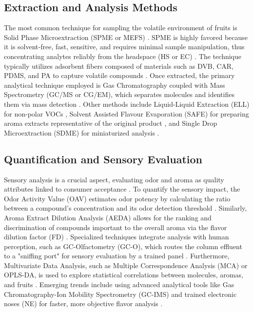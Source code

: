 \subsection{Extraction and Analysis Methods}
The most common technique for sampling the volatile environment of fruits is Solid Phase Microextraction (SPME or MEFS) \cite*{A01_Aguirre-Lopez_2023}. SPME is highly favored because it is solvent-free, fast, sensitive, and requires minimal sample manipulation, thus concentrating analytes reliably from the headspace (HS or EC) \cite*{A01_Aguirre-Lopez_2023,A03_PanoFarias2017}. The technique typically utilizes adsorbent fibers composed of materials such as DVB, CAR, PDMS, and PA to capture volatile compounds \cite*{A01_Aguirre-Lopez_2023}. Once extracted, the primary analytical technique employed is Gas Chromatography coupled with Mass Spectrometry (GC/MS or CG/EM), which separates molecules and identifies them via mass detection \cite*{A01_Aguirre-Lopez_2023}. Other methods include Liquid-Liquid Extraction (ELL) for non-polar VOCs \cite*{A01_Aguirre-Lopez_2023}, Solvent Assisted Flavour Evaporation (SAFE) for preparing aroma extracts representative of the original product \cite*{A01_Aguirre-Lopez_2023}, and Single Drop Microextraction (SDME) for miniaturized analysis \cite*{A03_PanoFarias2017}.


\subsection{Quantification and Sensory Evaluation}
Sensory analysis is a crucial aspect, evaluating odor and aroma as quality attributes linked to consumer acceptance \cite*{A01_Aguirre-Lopez_2023}. To quantify the sensory impact, the Odor Activity Value (OAV) estimates odor potency by calculating the ratio between a compound's concentration and its odor detection threshold \cite*{A01_Aguirre-Lopez_2023,A07_Bonneau2016}. Similarly, Aroma Extract Dilution Analysis (AEDA) allows for the ranking and discrimination of compounds important to the overall aroma via the flavor dilution factor (FD) \cite*{A01_Aguirre-Lopez_2023,A07_Bonneau2016}. Specialized techniques integrate analysis with human perception, such as GC-Olfactometry (GC-O), which routes the column effluent to a "sniffing port" for sensory evaluation by a trained panel \cite*{A01_Aguirre-Lopez_2023}. Furthermore, Multivariate Data Analysis, such as Multiple Correspondence Analysis (MCA) or OPLS-DA, is used to explore statistical correlations between molecules, aromas, and fruits \cite*{A01_Aguirre-Lopez_2023,A15_Xie2023}. Emerging trends include using advanced analytical tools like Gas Chromatography-Ion Mobility Spectrometry (GC-IMS) and trained electronic noses (NE) for faster, more objective flavor analysis \cite*{A01_Aguirre-Lopez_2023,A15_Xie2023}.


